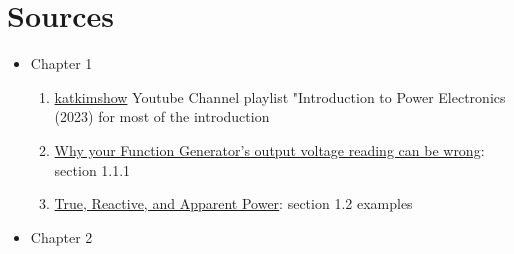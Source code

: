 \documentclass{article}
\begin{document}
\section{Sources}
\begin{itemize}
    \item Chapter 1
    \begin{enumerate}
        \item \href{https://www.youtube.com/watch?v=hRAyfJLZnC0&list=PLmK1EnKxphinxBub5hL0ZoJXWoqjkGE19}{katkimshow} Youtube Channel playlist "Introduction to Power Electronics (2023) for most of the introduction
        \item \href{https://www.youtube.com/watch?v=tClE8s6RZdg}{Why your Function Generator's output voltage reading can be wrong}: section 1.1.1
        \item \href{https://www.allaboutcircuits.com/textbook/alternating-current/chpt-11/true-reactive-and-apparent-power/}{True, Reactive, and Apparent Power}: section 1.2 examples
    \end{enumerate}

    \item Chapter 2
    

\end{itemize}
\end{document}
